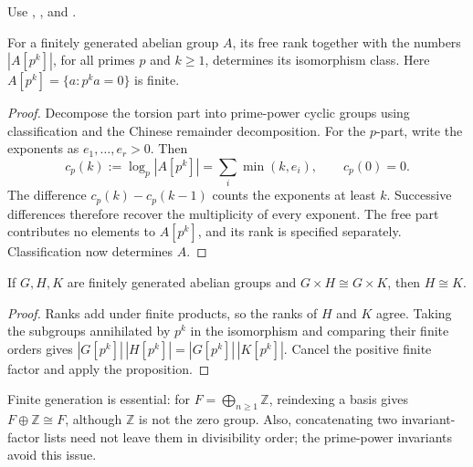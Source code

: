 Use ,
, and
.

\begin{proposition}\label{primary-count-invariants}
For a finitely generated abelian group $A$, its free rank together
with the numbers $|A[p^k]|$, for all primes $p$ and $k\ge1$, determines
its isomorphism class. Here $A[p^k]=\{a:p^ka=0\}$ is finite.
\end{proposition}
\begin{proof}\label{primary-count-invariants-proof}
Decompose the torsion part into prime-power cyclic groups using
classification and the Chinese remainder decomposition. For the
$p$-part, write the exponents as $e_1,\ldots,e_r>0$. Then
\[
 c_p(k):=\log_p|A[p^k]|=\sum_i\min(k,e_i),\qquad c_p(0)=0.
\]
The difference $c_p(k)-c_p(k-1)$ counts the exponents at least $k$.
Successive differences therefore recover the multiplicity of every
exponent. The free part contributes no elements to $A[p^k]$, and its
rank is specified separately. Classification now determines $A$.
\end{proof}
\begin{corollary}\label{abelian-cancellation}
If $G,H,K$ are finitely generated abelian groups and
$G\times H\cong G\times K$, then $H\cong K$.
\end{corollary}
\begin{proof}\label{abelian-cancellation-proof}
Ranks add under finite products, so the ranks of $H$ and $K$ agree.
Taking the subgroups annihilated by $p^k$ in the isomorphism and
comparing their finite orders gives
$|G[p^k]|\,|H[p^k]|=|G[p^k]|\,|K[p^k]|$.
Cancel the positive finite factor and apply the proposition.
\end{proof}
\begin{remark}\label{cancellation-scope}
Finite generation is essential: for $F=\bigoplus_{n\ge1}\mathbb Z$,
reindexing a basis gives $F\oplus\mathbb Z\cong F$, although
$\mathbb Z$ is not the zero group. Also, concatenating two
invariant-factor lists need not leave them in divisibility order;
the prime-power invariants avoid this issue.
\end{remark}
